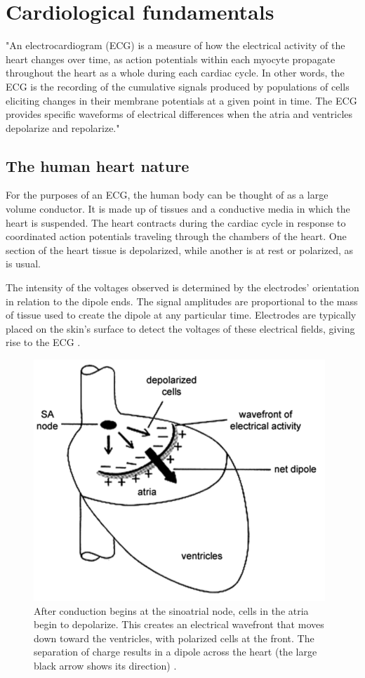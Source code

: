 \chapter{Cardiological fundamentals} \label{chap2}

\cite{ecg1} "An electrocardiogram (ECG) is a measure of how the electrical activity of the heart changes over time, as action potentials within each myocyte propagate throughout the heart as a whole during each cardiac cycle. In other words, the ECG is the recording of the cumulative signals produced by populations of cells eliciting changes in their membrane potentials at a given point in time. The ECG provides specific waveforms of electrical differences when the atria and ventricles depolarize and repolarize."

\section{The human heart nature} \label{heart_nature}

For the purposes of an ECG, the human body can be thought of as a large volume conductor. It is made up of tissues and a conductive media in which the heart is suspended. The heart contracts during the cardiac cycle in response to coordinated action potentials traveling through the chambers of the heart. One section of the heart tissue is depolarized, while another is at rest or polarized, as is usual. 

The intensity of the voltages observed is determined by the electrodes' orientation in relation to the dipole ends. The signal amplitudes are proportional to the mass of tissue used to create the dipole at any particular time. Electrodes are typically placed on the skin's surface to detect the voltages of these electrical fields, giving rise to the ECG \cite{ecg1}.

\begin{figure}[H]
\centering
\includegraphics[scale=0.7]{img/heart_nature.PNG}
\caption{After conduction begins at the sinoatrial node, cells in the atria begin to depolarize. This creates an electrical wavefront that moves down toward the ventricles, with polarized cells at the front. The separation of charge results in a dipole across the heart (the large black arrow shows its direction) \cite{ecg1}.}
\label{fig:heart_nat}
\end{figure}


